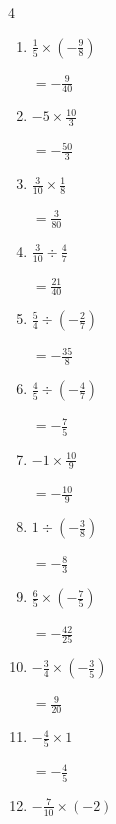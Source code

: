 \begin{multicols}{4}
\begin{enumerate}
  \item $\displaystyle \frac{1}{5}\times{}\left(-\frac{9}{8}\right)$

        $\displaystyle =-\frac{9}{40}$

  \item $\displaystyle -5\times{}\frac{10}{3}$

        $\displaystyle =-\frac{50}{3}$

  \item $\displaystyle \frac{3}{10}\times{}\frac{1}{8}$

        $\displaystyle =\frac{3}{80}$

  \item $\displaystyle \frac{3}{10}\div{}\frac{4}{7}$

        $\displaystyle =\frac{21}{40}$

  \item $\displaystyle \frac{5}{4}\div{}\left(-\frac{2}{7}\right)$

        $\displaystyle =-\frac{35}{8}$

  \item $\displaystyle \frac{4}{5}\div{}\left(-\frac{4}{7}\right)$

        $\displaystyle =-\frac{7}{5}$

  \item $\displaystyle -1\times{}\frac{10}{9}$

        $\displaystyle =-\frac{10}{9}$

  \item $\displaystyle 1\div{}\left(-\frac{3}{8}\right)$

        $\displaystyle =-\frac{8}{3}$

  \item $\displaystyle \frac{6}{5}\times{}\left(-\frac{7}{5}\right)$

        $\displaystyle =-\frac{42}{25}$

  \item $\displaystyle -\frac{3}{4}\times{}\left(-\frac{3}{5}\right)$

        $\displaystyle =\frac{9}{20}$

\columnbreak %

\resetques

  \item $\displaystyle -\frac{4}{5}\times{}1$

        $\displaystyle =-\frac{4}{5}$

  \item $\displaystyle -\frac{7}{10}\times{}\left(-2\right)$


\end{enumerate}
\end{multicols}
